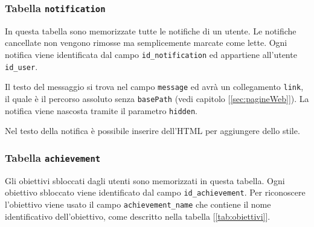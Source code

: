 \subsubsection{Tabella \texttt{notification}}

In questa tabella sono memorizzate tutte le notifiche di un utente. Le notifiche cancellate non vengono rimosse ma semplicemente marcate come lette. Ogni notifica viene identificata dal campo \texttt{id\_notification} ed appartiene all'utente \texttt{id\_user}.

Il testo del messaggio si trova nel campo \texttt{message} ed avrà un collegamento \texttt{link}, il quale è il percorso assoluto senza \texttt{basePath} (vedi capitolo [\ref{sec:pagineWeb}]). La notifica viene nascosta tramite il parametro \texttt{hidden}.

Nel testo della notifica è possibile inserire dell'HTML per aggiungere dello stile.



\subsubsection{Tabella \texttt{achievement}}

Gli obiettivi sbloccati dagli utenti sono memorizzati in questa tabella. Ogni obiettivo sbloccato viene identificato dal campo \texttt{id\_achievement}. Per riconoscere l'obiettivo viene usato il campo \texttt{achievement\_name} che contiene il nome identificativo dell'obiettivo, come descritto nella tabella [\ref{tab:obiettivi}].



